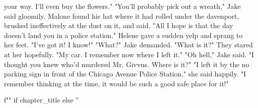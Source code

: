 \documentclass{novel}
\begin{document}
your way. I'll even buy the flowers." "You'll probably pick out a wreath," Jake said gloomily. Malone found his hat where it had rolled under the davenport, brushed ineffectively at the dust on it, and said, "All I hope is that the day doesn't land you in a police station." Helene gave a sudden yelp and sprang to her feet. "I've got it! I know!" "What?" Jake demanded. "What is it?" They stared at her hopefully. "My car. I remember now where I left it." "Oh hell," Jake said. "I thought you knew who'd murdered Mr. Givvus. Where is it?" "I left it by the no parking sign in front of the Chicago Avenue Police Station," she said happily. "I remember thinking at the time, it would be such a good safe place for it!"

\begin{ChapterStart}
\vspace{3\nbs}
f"" if chapter_title else ''
\end{ChapterStart}
\end{document}
